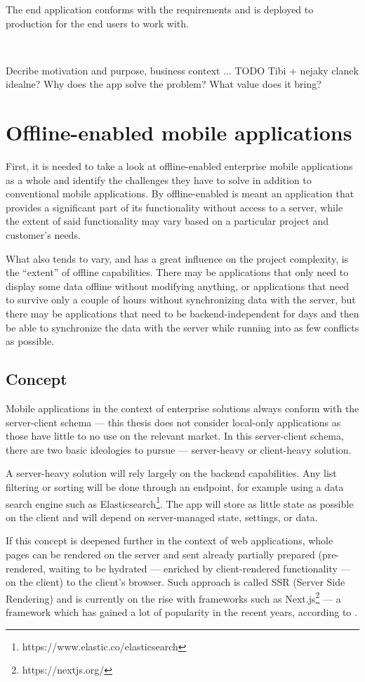 \documentclass[
  digital,     %
  color,       %
  oneside,     %
  nosansbold,  %
  nocolorbold, %
  lof,         %
  lot,         %
]{fithesis4}
\begin{document}
The end application conforms with the requirements and is deployed to production for the end users to work with.

~

Decribe motivation and purpose, business context ... TODO Tibi + nejaky clanek idealne?
Why does the app solve the problem? What value does it bring?

\chapter{Offline-enabled mobile applications}
First, it is needed to take a look at offline-enabled enterprise mobile applications as a whole and identify the challenges they have to solve in addition to conventional mobile applications. By offline-enabled is meant an application that provides a significant part of its functionality without access to a server, while the extent of said functionality may vary based on a particular project and customer's needs. 

What also tends to vary, and has a great influence on the project complexity, is the ``extent'' of offline capabilities. There may be applications that only need to display some data offline without modifying anything, or applications that need to survive only a couple of hours without synchronizing data with the server, but there may be applications that need to be backend-independent for days and then be able to synchronize the data with the server while running into as few conflicts as possible.
\section{Concept}
Mobile applications in the context of enterprise solutions always conform with the server-client schema --- this thesis does not consider local-only applications as those have little to no use on the relevant market. In this server-client schema, there are two basic ideologies to pursue --- server-heavy or client-heavy solution. 

A server-heavy solution will rely largely on the backend capabilities. Any list filtering or sorting will be done through an endpoint, for example using a data search engine such as Elasticsearch\footnote{https://www.elastic.co/elasticsearch}. The app will store as little state as possible on the client and will depend on server-managed state, settings, or data. 

If this concept is deepened further in the context of web applications, whole pages can be rendered on the server and sent already partially prepared (pre-rendered, waiting to be hydrated --- enriched by client-rendered functionality --- on the client) to the client's browser. Such approach is called SSR (Server Side Rendering) and is currently on the rise with frameworks such as Next.js\footnote{https://nextjs.org/} --- a framework which has gained a lot of popularity in the recent years, according to \cite{nextJsArticle}.
\end{document}
